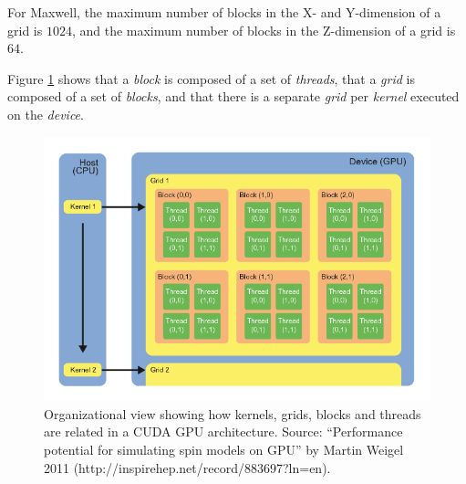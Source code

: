 \begin{enumerate}
\begin{itemize}
For Maxwell, the maximum number of blocks in the X- and Y-dimension of a grid is $1024$, and the maximum number of blocks in the Z-dimension of a grid is $64$.

\end{itemize}

Figure \ref{figure:gridblock} shows that a \textit{block} is composed of a set of \textit{threads}, that a \textit{grid} is composed of a set of \textit{blocks}, and that there is a separate \textit{grid} per \textit{kernel} executed on the \textit{device}.

\begin{figure}[p]
\includegraphics[width=\linewidth]{images/gridblock}
\caption{Organizational view showing how kernels, grids, blocks and threads are related in a \ac{CUDA} \ac{GPU} architecture. Source: ``Performance potential for simulating spin models on GPU'' by Martin Weigel 2011 (http://inspirehep.net/record/883697?ln=en).}
\label{figure:gridblock}
\end{figure}


\end{enumerate}
